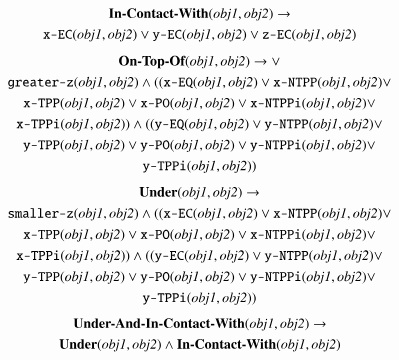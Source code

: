\documentclass[preprint,12pt]{elsarticle}
\begin{document}
\begin{gather}
\label{eq:in-contact-with}
\textbf{In-Contact-With}(\textit{obj1}, \textit{obj2}) \rightarrow \\
\texttt{x-EC}(\textit{obj1}, \textit{obj2}) \vee \texttt{y-EC}(\textit{obj1}, \textit{obj2}) \vee \texttt{z-EC}(\textit{obj1}, \textit{obj2})\notag
\end{gather}
\begin{gather}
\label{eq:on-top-of}
\textbf{On-Top-Of}(\textit{obj1}, \textit{obj2}) \rightarrow \vee \\
\texttt{greater-z}(\textit{obj1}, \textit{obj2}) \wedge ((\texttt{x-EQ}(\textit{obj1}, \textit{obj2}) \vee \texttt{x-NTPP}(\textit{obj1}, \textit{obj2}) \vee \notag\\
\texttt{x-TPP}(\textit{obj1}, \textit{obj2}) \vee \texttt{x-PO}(\textit{obj1}, \textit{obj2}) \vee \texttt{x-NTPPi}(\textit{obj1}, \textit{obj2}) \vee \notag\\
\texttt{x-TPPi}(\textit{obj1}, \textit{obj2})) \wedge ((\texttt{y-EQ}(\textit{obj1}, \textit{obj2}) \vee \texttt{y-NTPP}(\textit{obj1}, \textit{obj2}) \vee \notag\\
\texttt{y-TPP}(\textit{obj1}, \textit{obj2}) \vee \texttt{y-PO}(\textit{obj1}, \textit{obj2}) \vee \texttt{y-NTPPi}(\textit{obj1}, \textit{obj2}) \vee \notag\\
\texttt{y-TPPi}(\textit{obj1}, \textit{obj2})) \notag
\end{gather}
\begin{gather}
\label{eq:under}
\textbf{Under}(\textit{obj1}, \textit{obj2}) \rightarrow \\
\texttt{smaller-z}(\textit{obj1}, \textit{obj2}) \wedge ((\texttt{x-EC}(\textit{obj1}, \textit{obj2}) \vee \texttt{x-NTPP}(\textit{obj1}, \textit{obj2}) \vee  \notag\\
\texttt{x-TPP}(\textit{obj1}, \textit{obj2}) \vee \texttt{x-PO}(\textit{obj1}, \textit{obj2}) \vee \texttt{x-NTPPi}(\textit{obj1}, \textit{obj2}) \vee  \notag\\
\texttt{x-TPPi}(\textit{obj1}, \textit{obj2})) \wedge ((\texttt{y-EC}(\textit{obj1}, \textit{obj2}) \vee \texttt{y-NTPP}(\textit{obj1}, \textit{obj2}) \vee  \notag\\
\texttt{y-TPP}(\textit{obj1}, \textit{obj2}) \vee \texttt{y-PO}(\textit{obj1}, \textit{obj2}) \vee \texttt{y-NTPPi}(\textit{obj1}, \textit{obj2}) \vee  \notag\\
\texttt{y-TPPi}(\textit{obj1}, \textit{obj2})) \notag
\end{gather}
\begin{gather}
\label{eq:Under-And-In-Contact-With}
\textbf{Under-And-In-Contact-With}(\textit{obj1}, \textit{obj2}) \rightarrow \\
\textbf{Under}(\textit{obj1}, \textit{obj2}) \wedge \textbf{In-Contact-With}(\textit{obj1}, \textit{obj2})\notag
\end{gather}
\end{document}
